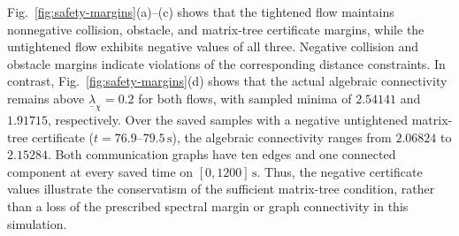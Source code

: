 Fig.~\ref{fig:safety-margins}(a)--(c) shows that the tightened flow
maintains nonnegative collision, obstacle, and matrix-tree certificate
margins, while the untightened flow exhibits negative values of all three.
Negative collision and obstacle margins indicate violations of the
corresponding distance constraints. In contrast,
Fig.~\ref{fig:safety-margins}(d) shows that the actual algebraic
connectivity remains above $\underline{\lambda}_{\chi}=0.2$ for both flows,
with sampled minima of $2.54141$ and $1.91715$, respectively.
Over the saved samples with a negative untightened matrix-tree certificate
($t=76.9$--$79.5\,\mathrm{s}$), the algebraic connectivity ranges from
$2.06824$ to $2.15284$.
Both communication graphs have ten edges and one connected component
at every saved time on $[0,1200]\,\mathrm{s}$.
Thus, the negative certificate values illustrate the conservatism of
the sufficient matrix-tree condition, rather than a loss of the prescribed
spectral margin or graph connectivity in this simulation.
